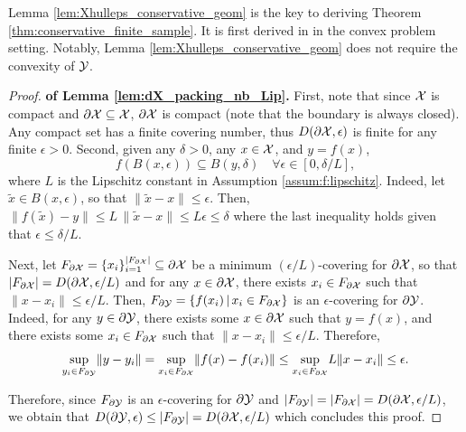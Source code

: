 \documentclass[12pt]{l4dc2022} %
\begin{document}
Lemma \ref{lem:Xhulleps_conservative_geom} is the key to deriving Theorem \ref{thm:conservative_finite_sample}. 
It is first derived in \citep{Dumbgen1996} in the convex problem setting. Notably, Lemma \ref{lem:Xhulleps_conservative_geom} does not require the convexity of $\mathcal{Y}$.
\\



\begin{proof}\textbf{of Lemma \ref{lem:dX_packing_nb_Lip}.} 
First, note that 
since $\mathcal{X}$ is compact and $\partial\mathcal{X}\subseteq\mathcal{X}$, $\partial\mathcal{X}$ is compact (note that the boundary is always closed). Any compact set has a finite covering number, thus $D(\partial\mathcal{X}, \epsilon)$ is finite for any finite $\epsilon>0$. 
% 
% 
Second,   
given any $\delta>0$, 
any $x\in\mathcal{X}$, and $y=f(x)$,
\begin{equation}\label{eq:lipschitz_ball_conservative}
f(B(x,\epsilon)) \subseteq B(y,\delta)
\quad
\forall \epsilon\in[0,\delta/L],
\end{equation}
where $L$ is the Lipschitz constant in Assumption \ref{assum:f:lipschitz}. %
% 
Indeed, let $\tilde{x}\in B(x,\epsilon)$, so that $\|\tilde{x}-x\|\leq\epsilon$. Then, $
\|f(\tilde{x})-y\|
\leq L\,\|\tilde{x}-x\|\leq L\epsilon\leq\delta$ where the last inequality holds given that $\epsilon \leq \delta/L$. 


Next, let $F_{\partial\mathcal{X}}=\{x_i\}_{i=1}^{|F_{\partial\mathcal{X}}|}\subseteq\partial\mathcal{X}$ be a minimum $(\epsilon/L)$-covering for $\partial\mathcal{X}$, so that $|F_{\partial\mathcal{X}}|=D(\partial\mathcal{X},\epsilon/L)$ and 
 for any $x\in\partial\mathcal{X}$, there exists $x_i\in F_{\partial\mathcal{X}}$ such that $\|x-x_i\|\leq \epsilon/L$. %
Then, $F_{\partial\mathcal{Y}}=\{f(x_i)\, |\,x_i\in F_{\partial\mathcal{X}} \}$ is an $\epsilon$-covering for $\partial\mathcal{Y}$. 
	Indeed, for any $y\in\partial\mathcal{Y}$, there exists some $x\in\partial\mathcal{X}$ such that $y=f(x)$, and there exists some $x_i\in F_{\partial\mathcal{X}}$ such that $\|x-x_i\|\leq \epsilon/L$. Therefore, 
	$$\underset{y_i\in F_{\partial\mathcal{Y}}}{\sup} \|y-y_i\| = \underset{x_i\in F_{\partial\mathcal{X}}}{\sup} \|f(x)-f(x_i)\| 
\leq \underset{x_i\in F_{\partial\mathcal{X}}}{\sup} L\|x-x_i\| \leq \epsilon.$$ 

Therefore, since $F_{\partial\mathcal{Y}}$ is an $\epsilon$-covering for $\partial\mathcal{Y}$ and $|F_{\partial\mathcal{Y}}|=|F_{\partial\mathcal{X}}|=D(\partial\mathcal{X},\epsilon/L)$, we obtain that 
$D(\partial\mathcal{Y},\epsilon)\leq |F_{\partial\mathcal{Y}}| = D(\partial\mathcal{X},\epsilon/L)$ which concludes this proof.
\end{proof}
\end{document}
